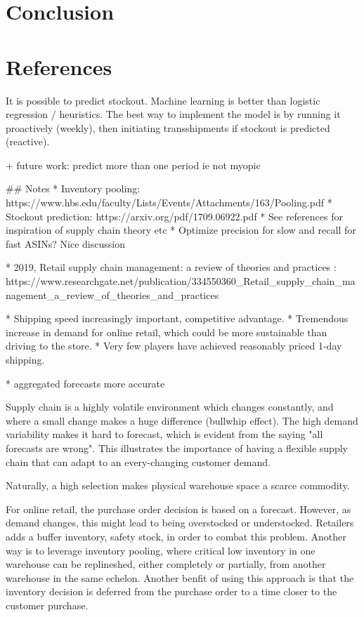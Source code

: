 \documentclass[../../main.tex]{subfiles}
\begin{document}

\chapter{Conclusion}
\chapter{References}

It is possible to predict stockout. Machine learning is better than logistic regression / heuristics. The best way to implement the model is by running it proactively (weekly), then initiating transshipments if stockout is predicted (reactive). 

+ future work: predict more than one period ie not myopic

## Notes
* Inventory pooling: https://www.hbs.edu/faculty/Lists/Events/Attachments/163/Pooling.pdf
* Stockout prediction: https://arxiv.org/pdf/1709.06922.pdf
    * See references for inspiration of supply chain theory etc
* Optimize precision for slow and recall for fast ASINs? Nice discussion

* 2019, Retail supply chain management: a review of theories and practices : https://www.researchgate.net/publication/334550360_Retail_supply_chain_management_a_review_of_theories_and_practices

* Shipping speed increasingly important, competitive advantage.
* Tremendous increase in demand for online retail, which could be more sustainable than driving to the store.
* Very few players have achieved reasonably priced 1-day shipping.

* aggregated forecasts more accurate

Supply chain is a highly volatile environment which changes constantly, and where a small change makes a huge difference (bullwhip effect). The high demand variability makes it hard to forecast, which is evident from the saying "all forecasts are wrong". This illustrates the importance of having a flexible supply chain that can adapt to an every-changing customer demand.

Naturally, a high selection makes physical warehouse space a scarce commodity. 

For online retail, the purchase order decision is based on a forecast. However, as demand changes, this might lead to being overstocked or understocked. Retailers adds a buffer inventory, safety stock, in order to combat this problem. Another way is to leverage inventory pooling, where critical low inventory in one warehouse can be replineshed, either completely or partially, from another warehouse in the same echelon. Another benfit of using this approach is that the inventory decision is deferred from the purchase order to a time closer to the customer purchase.
\end{document}
